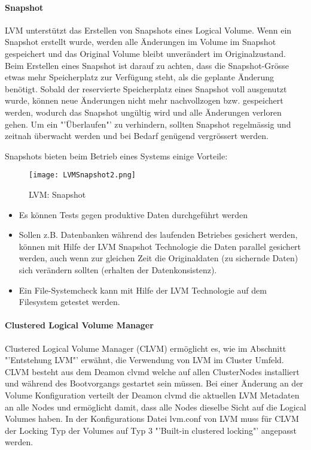 \paragraph{Snapshot} $\;$\\
LVM unterstützt das Erstellen von \gls{Snapshot}s eines Logical Volume. Wenn ein \gls{Snapshot} erstellt wurde, werden alle Änderungen im Volume im \gls{Snapshot} gespeichert und das Original Volume bleibt unverändert im Originalzustand. Beim Erstellen eines \gls{Snapshot} ist darauf zu achten, dass die Snapshot-Grösse etwas mehr Speicherplatz zur Verfügung steht, als die geplante Änderung benötigt. Sobald der reservierte Speicherplatz eines \gls{Snapshot} voll ausgenutzt wurde, können neue Änderungen nicht mehr nachvollzogen bzw. gespeichert werden, wodurch das \gls{Snapshot} ungültig wird und alle Änderungen verloren gehen.
Um ein "'Überlaufen"' zu verhindern, sollten \gls{Snapshot} regelmässig und zeitnah überwacht werden und bei Bedarf genügend vergrössert werden.

Snapshots bieten beim Betrieb eines Systems einige Vorteile:

\begin{figure}[htb]
\centering
\texttt{[image: LVMSnapshot2.png]}
\caption{LVM: Snapshot}
\label{fig:LVMSnapshot}
\end{figure}


\begin{itemize}
\item Es können Tests gegen produktive Daten durchgeführt werden
\item Sollen z.B. Datenbanken während des laufenden Betriebes gesichert werden, können mit Hilfe der LVM \gls{Snapshot} Technologie die Daten parallel gesichert werden, auch wenn zur gleichen Zeit die Originaldaten (zu sichernde Daten) sich verändern sollten (erhalten der Datenkonsistenz).
\item Ein File-Systemcheck kann mit Hilfe der LVM Technologie auf dem Filesystem getestet werden.
\end{itemize}

\paragraph{Clustered Logical Volume Manager} $\;$\\
Clustered Logical Volume Manager (CLVM) ermöglicht es, wie im Abschnitt "'Entstehung LVM"' erwähnt, die Verwendung von LVM im \gls{Cluster} Umfeld. CLVM besteht aus dem Deamon clvmd welche auf allen \gls{ClusterNode}s installiert und während des Bootvorgangs gestartet sein müssen. Bei einer Änderung an der Volume Konfiguration verteilt der Deamon clvmd die aktuellen LVM Metadaten an alle Nodes und ermöglicht damit, dass alle Nodes dieselbe Sicht auf die Logical Volumes haben. In der Konfigurations Datei  lvm.conf von LVM muss für CLVM der Locking Typ der Volumes auf Typ 3 "'Built-in clustered locking"' angepasst werden.


